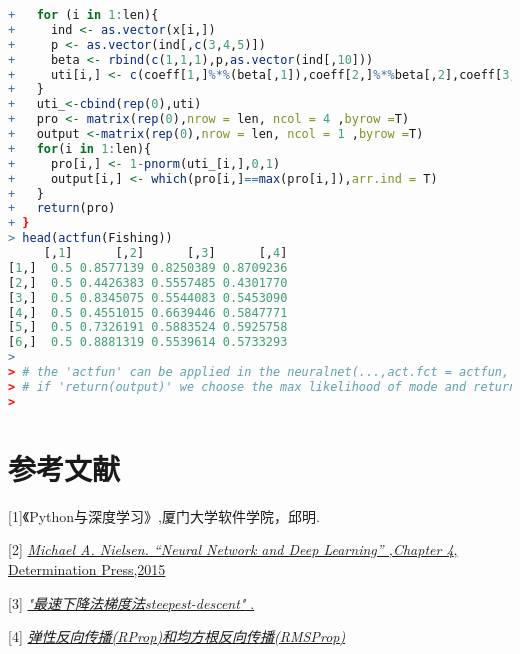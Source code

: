 \documentclass[cn]{elegantpaper}
\begin{document}
{\begin{lstlisting}[language=R]
+   for (i in 1:len){
+     ind <- as.vector(x[i,])
+     p <- as.vector(ind[,c(3,4,5)])
+     beta <- rbind(c(1,1,1),p,as.vector(ind[,10]))
+     uti[i,] <- c(coeff[1,]%*%(beta[,1]),coeff[2,]%*%beta[,2],coeff[3,]%*%beta[,3]) 
+   }
+   uti_<-cbind(rep(0),uti)
+   pro <- matrix(rep(0),nrow = len, ncol = 4 ,byrow =T)
+   output <-matrix(rep(0),nrow = len, ncol = 1 ,byrow =T)
+   for(i in 1:len){
+     pro[i,] <- 1-pnorm(uti_[i,],0,1)
+     output[i,] <- which(pro[i,]==max(pro[i,]),arr.ind = T)
+   }
+   return(pro)
+ }
> head(actfun(Fishing))
     [,1]      [,2]      [,3]      [,4]
[1,]  0.5 0.8577139 0.8250389 0.8709236
[2,]  0.5 0.4426383 0.5557485 0.4301770
[3,]  0.5 0.8345075 0.5544083 0.5453090
[4,]  0.5 0.4551015 0.6639446 0.5847771
[5,]  0.5 0.7326191 0.5883524 0.5925758
[6,]  0.5 0.8881319 0.5539614 0.5733293
>
> # the 'actfun' can be applied in the neuralnet(...,act.fct = actfun, ...) 
> # if 'return(output)' we choose the max likelihood of mode and return class
>
\end{lstlisting}}


\section{参考文献}
[1]《Python与深度学习》,厦门大学软件学院，邱明.

[2] \href{http://neuralnetworksanddeeplearning.com/chap4.html}{\emph{Michael A. Nielsen. “Neural Network and Deep Learning” ,Chapter 4}, Determination Press,2015}

[3] \href{https://www.codelast.com/原创-再谈-最速下降法梯度法steepest-descent/}{\emph{"最速下降法梯度法steepest-descent" }.} 

[4] \href{https://blog.csdn.net/tsq292978891/article/details/78619384}{\emph{弹性反向传播(RProp)和均方根反向传播(RMSProp)}}
\end{document}
